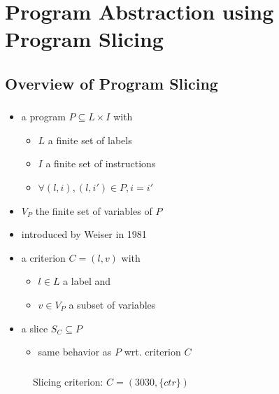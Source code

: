 \documentclass{beamer}
\begin{document}

  \section{Program Abstraction using Program Slicing}
  \begin{frame}
    \frametitle{\secname}
    \tableofcontents[currentsection]
  \end{frame}

  \subsection{Overview of Program Slicing}
  \begin{frame}
    \frametitle{\secname}
    \framesubtitle{\subsecname}

    \begin{itemize}
      \item a program $P \subseteq L \times I$ with
        \begin{itemize}
          \item $L$ a finite set of labels
          \item $I$ a finite set of instructions
          \item $\forall (l,i), (l,i') \in P, i = i'$
        \end{itemize}
      \item $V_P$ the finite set of variables of $P$

      \vspace{1em}
      \item introduced by Weiser in 1981~\cite{Wei81}
      \item a criterion $C = (l,v)$ with
        \begin{itemize}
          \item $l \in L$ a label and
          \item $v \in V_P$ a subset of variables
        \end{itemize}
      \item a slice $S_C \subseteq P$
        \begin{itemize}
          \item same behavior as $P$ wrt. criterion $C$
        \end{itemize}
    \end{itemize}
  \end{frame}
  
  \begin{frame}
    \frametitle{\secname}
    \framesubtitle{\subsecname}

    \vspace{1em}
    \begin{figure}
      \centering
      \begin{overlayarea}{\textwidth}{\textheight}
        \begin{center}
          Slicing criterion: $C = ( 3030, \{ctr\} )$
        \end{center}
      \end{overlayarea}
    \end{figure}
  \end{frame}
  
\end{document}
